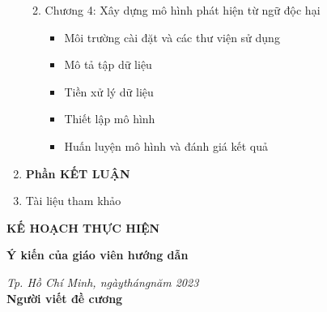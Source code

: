 \begin{enumerate}[label=\textbf{\arabic*.}]
\begin{enumerate}
\begin{itemize}
                    \end{itemize}
              \item Chương 4: Xây dựng mô hình phát hiện từ ngữ độc hại
                    \begin{itemize}
                        \item Môi trường cài đặt và các thư viện sử dụng
                        \item Mô tả tập dữ liệu
                        \item Tiền xử lý dữ liệu
                        \item Thiết lập mô hình
                        \item Huấn luyện mô hình và đánh giá kết quả
                    \end{itemize}
          \end{enumerate}
    \item \textbf{Phần KẾT LUẬN}
    \item Tài liệu tham khảo
          \begin{enumerate}[label={[\arabic*]}]
            \item \dots
            \item \dots
          \end{enumerate}
\end{enumerate}

\textbf{KẾ HOẠCH THỰC HIỆN}


\noindent\begin{minipage}[t]{0.43\textwidth}
    \centering
    \fontsize{11pt}{16.5pt}
    \textbf{Ý kiến của giáo viên hướng dẫn}\\
\end{minipage}
\begin{minipage}[t]{0.57\textwidth}
    \centering
    \fontsize{11pt}{16.5pt}
    \textit{Tp. Hồ Chí Minh, ngày\qquad tháng\qquad năm 2023}\\    
    \textbf{Người viết đề cương}\\
\end{minipage}
